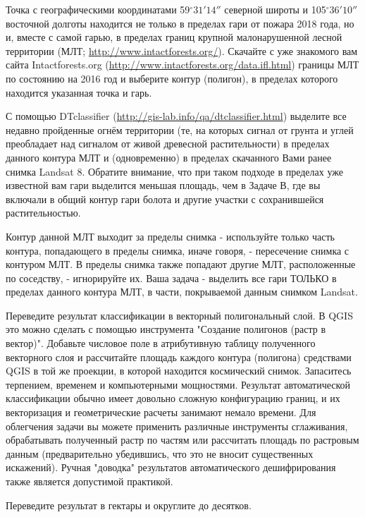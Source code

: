 
Точка с географическими координатами 59$^{\circ}31'14''$ северной широты и 105$^{\circ}36'10''$ восточной долготы 
находится не только в пределах гари от пожара 2018 года, но и, вместе с самой гарью, в пределах границ 
крупной малонарушенной лесной территории (МЛТ; \url{http://www.intactforests.org/}). Скачайте с уже знакомого 
вам сайта Intactforests.org (\url{http://www.intactforests.org/data.ifl.html}) границы МЛТ по состоянию на 2016 год и выберите контур (полигон), в пределах которого находится указанная точка и гарь.

С помощью DTclassifier (\url{http://gis-lab.info/qa/dtclassifier.html}) выделите все недавно пройденные огнём территории (те, на которых сигнал от грунта и углей преобладает над сигналом от живой древесной растительности) в пределах данного контура МЛТ и (одновременно) в пределах скачанного Вами ранее снимка Landsat 8. Обратите внимание, что при таком подходе в пределах уже известной вам гари выделится меньшая площадь, чем в Задаче В, где вы включали в общий контур гари болота и другие участки с сохранившейся растительностью.

Контур данной МЛТ выходит за пределы снимка - используйте только часть контура, попадающего в пределы снимка, иначе говоря, - пересечение снимка с контуром МЛТ. В пределы снимка также попадают другие МЛТ, расположенные по соседству, - игнорируйте их. Ваша задача - выделить все гари ТОЛЬКО в пределах данного контура МЛТ, в части, покрываемой данным снимком Landsat.

Переведите результат классификации в векторный полигональный слой. В QGIS это можно сделать с помощью инструмента "Создание полигонов (растр в вектор)". Добавьте числовое поле в атрибутивную таблицу полученного векторного слоя и рассчитайте площадь каждого контура (полигона) средствами QGIS в той же проекции, в которой находится космический снимок. Запаситесь терпением, временем и компьютерными мощностями. Результат автоматической классификации обычно имеет довольно сложную конфигурацию границ, и их векторизация и геометрические расчеты занимают немало времени. Для облегчения задачи вы можете применить различные инструменты сглаживания, обрабатывать полученный растр по частям или рассчитать площадь по растровым данным (предварительно убедившись, что это не вносит существенных искажений). Ручная "доводка" результатов автоматического дешифрирования также является допустимой практикой.

Переведите результат в гектары и округлите до десятков.